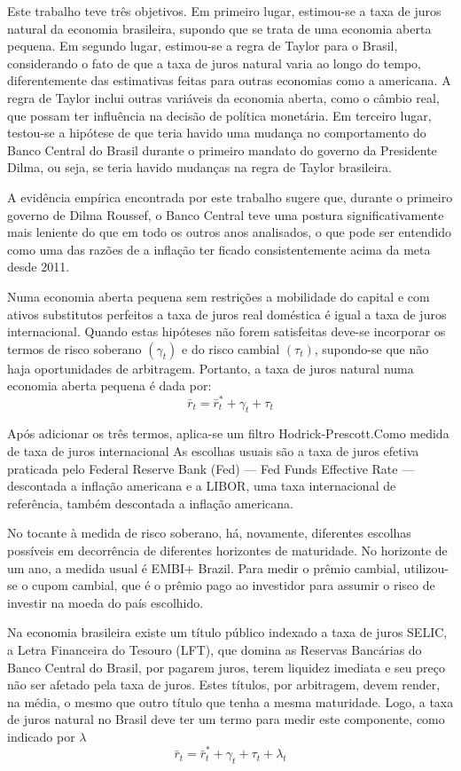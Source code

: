 Este trabalho teve três objetivos. Em primeiro lugar, estimou-se a taxa de juros natural da economia brasileira, supondo que se trata de uma economia aberta pequena. Em segundo lugar, estimou-se a
regra de Taylor para o Brasil, considerando o fato de que a taxa de juros natural varia ao longo do tempo, diferentemente das estimativas feitas para outras economias como a americana. A regra de Taylor inclui outras variáveis da economia aberta, como o câmbio real, que possam ter influência na decisão de
política monetária. Em terceiro lugar, testou-se a hipótese de que teria havido uma mudança no comportamento do Banco Central do Brasil durante o primeiro mandato do governo da Presidente Dilma, ou
seja, se teria havido mudanças na regra de Taylor brasileira. 

A evidência empírica encontrada por este trabalho sugere que, durante o primeiro governo de
Dilma Roussef, o Banco Central teve uma postura significativamente mais leniente do que em todo os
outros anos analisados, o que pode ser entendido como uma das razões de a inflação ter ficado consistentemente acima da meta desde 2011.

Numa economia aberta pequena sem restrições a mobilidade do capital e com ativos substitutos
perfeitos a taxa de juros real doméstica é igual a taxa de juros internacional. Quando estas hipóteses não forem satisfeitas deve-se incorporar os termos de risco soberano $(\gamma_t)$ e do risco cambial $(\tau_t)$, supondo-se que não haja oportunidades de arbitragem. Portanto, a taxa de juros natural numa economia aberta pequena é dada por:
\begin{equation}
    \bar{r}_t = \bar{r}_t^{*} + \gamma_t + \tau_t
\end{equation}

Após adicionar os três termos, aplica-se um filtro Hodrick-Prescott.Como medida de taxa de juros internacional As escolhas usuais são a taxa de juros efetiva praticada pelo Federal Reserve Bank (Fed) — Fed Funds Effective Rate — descontada a inflação americana e a LIBOR, uma taxa internacional de referência, também descontada a inflação americana.

No tocante à medida de risco soberano, há, novamente, diferentes escolhas possíveis em decorrência de diferentes horizontes de maturidade. No horizonte de um ano, a medida usual é EMBI+ Brazil. Para medir o prêmio cambial, utilizou-se o cupom cambial, que é o prêmio pago ao investidor para assumir o risco de investir na moeda do país escolhido. 

Na economia brasileira existe um título público indexado a taxa de juros SELIC, a Letra Financeira do Tesouro (LFT), que domina as Reservas Bancárias do Banco Central do Brasil, por pagarem juros, terem liquidez imediata e seu preço não ser afetado pela taxa de juros. Estes títulos, por arbitragem, devem render, na média, o mesmo que outro título que tenha a mesma maturidade. Logo, a taxa de juros natural no Brasil deve ter um termo para medir este componente, como indicado por $\lambda$
\begin{equation}
    \bar{r}_t = \bar{r}_t^{*} + \gamma_t + \tau_t + \lambda_t
\end{equation}

